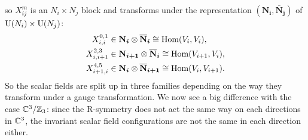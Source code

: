         so $X^m_{ij}$ is an $N_i\times N_j$ block and transforms under the representation $(\boldsymbol{\textbf{N}_i},\boldsymbol{\bar{\textbf{N}}_j})$ of $\text{U}(N_i)\times\text{U}(N_j)$:
        \begin{align}
            X^{0,1}_{i,i} &\in \boldsymbol{\textbf{N}_i}\otimes\boldsymbol{\overline{\textbf{N}}_i} \cong \text{Hom}(V_i,V_i),\\
            X^{2,3}_{i,i+1} &\in \boldsymbol{\textbf{N}_{i+1}}\otimes\boldsymbol{\overline{\textbf{N}}_i} \cong \text{Hom}(V_{i+1},V_i),\\
            X^{4,5}_{i+1,i} &\in \boldsymbol{\textbf{N}_i}\otimes\boldsymbol{\overline{\textbf{N}}_{i+1}} \cong \text{Hom}(V_i,V_{i+1}).
        \end{align}
        So the scalar fields are split up in three families depending on the way they transform under a gauge transformation. We now see a big difference with the case $\mathbb{C}^3/\mathbb{Z}_3$: since the R-symmetry does not act the same way on each directions in $\mathbb{C}^3$, the invariant scalar field configurations are not the same in each direction either.

